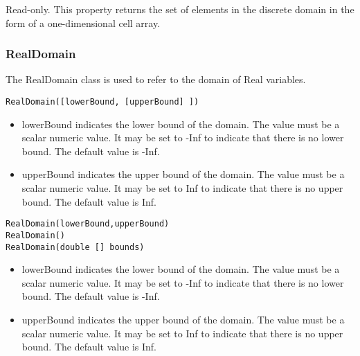 

Read-only.  This property returns the set of elements in the discrete domain in the form of a one-dimensional cell array.




\subsubsection{RealDomain}
\label{sec:RealDomain}

The RealDomain class is used to refer to the domain of Real variables.


\ifmatlab
\begin{lstlisting}
RealDomain([lowerBound, [upperBound] ])
\end{lstlisting}

\begin{itemize}
\item lowerBound indicates the lower bound of the domain.  The value must be a scalar numeric value.  It may be set to -Inf to indicate that there is no lower bound.  The default value is -Inf.
\item upperBound indicates the upper bound of the domain.  The value must be a scalar numeric value.  It may be set to Inf to indicate that there is no upper bound.  The default value is Inf.
\end{itemize}

\fi

\ifjava
\begin{lstlisting}
RealDomain(lowerBound,upperBound)
RealDomain()
RealDomain(double [] bounds)
\end{lstlisting}

\begin{itemize}
\item lowerBound indicates the lower bound of the domain.  The value must be a scalar numeric value.  It may be set to -Inf to indicate that there is no lower bound.  The default value is -Inf.
\item upperBound indicates the upper bound of the domain.  The value must be a scalar numeric value.  It may be set to Inf to indicate that there is no upper bound.  The default value is Inf.
\end{itemize}

\fi


\ifmatlab
{}
\fi
\ifjava
{}
\fi

